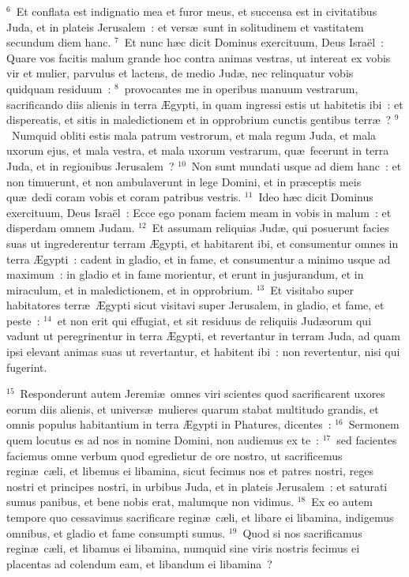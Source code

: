 ${}^{6}$~Et conflata est indignatio mea et furor meus, et succensa est in civitatibus Juda, et in plateis Jerusalem~: et vers\ae\ sunt in solitudinem et vastitatem secundum diem hanc.
${}^{7}$~Et nunc h\ae c dicit Dominus exercituum, Deus Isra\"el~: Quare vos facitis malum grande hoc contra animas vestras, ut intereat ex vobis vir et mulier, parvulus et lactens, de medio Jud\ae , nec relinquatur vobis quidquam residuum~:
${}^{8}$~provocantes me in operibus manuum vestrarum, sacrificando diis alienis in terra \AE gypti, in quam ingressi estis ut habitetis ibi~: et dispereatis, et sitis in maledictionem et in opprobrium cunctis gentibus terr\ae~?
${}^{9}$~Numquid obliti estis mala patrum vestrorum, et mala regum Juda, et mala uxorum ejus, et mala vestra, et mala uxorum vestrarum, qu\ae\ fecerunt in terra Juda, et in regionibus Jerusalem~?
${}^{10}$~Non sunt mundati usque ad diem hanc~: et non timuerunt, et non ambulaverunt in lege Domini, et in pr\ae ceptis meis qu\ae\ dedi coram vobis et coram patribus vestris.
${}^{11}$~Ideo h\ae c dicit Dominus exercituum, Deus Isra\"el~: Ecce ego ponam faciem meam in vobis in malum~: et disperdam omnem Judam.
${}^{12}$~Et assumam reliquias Jud\ae , qui posuerunt facies suas ut ingrederentur terram \AE gypti, et habitarent ibi, et consumentur omnes in terra \AE gypti~: cadent in gladio, et in fame, et consumentur a minimo usque ad maximum~: in gladio et in fame morientur, et erunt in jusjurandum, et in miraculum, et in maledictionem, et in opprobrium.
${}^{13}$~Et visitabo super habitatores terr\ae\ \AE gypti sicut visitavi super Jerusalem, in gladio, et fame, et peste~:
${}^{14}$~et non erit qui effugiat, et sit residuus de reliquiis Jud\ae orum qui vadunt ut peregrinentur in terra \AE gypti, et revertantur in terram Juda, ad quam ipsi elevant animas suas ut revertantur, et habitent ibi~: non revertentur, nisi qui fugerint.


${}^{15}$~Responderunt autem Jeremi\ae\ omnes viri scientes quod sacrificarent uxores eorum diis alienis, et univers\ae\ mulieres quarum stabat multitudo grandis, et omnis populus habitantium in terra \AE gypti in Phatures, dicentes~:
${}^{16}$~Sermonem quem locutus es ad nos in nomine Domini, non audiemus ex te~:
${}^{17}$~sed facientes faciemus omne verbum quod egredietur de ore nostro, ut sacrificemus regin\ae\ c\ae li, et libemus ei libamina, sicut fecimus nos et patres nostri, reges nostri et principes nostri, in urbibus Juda, et in plateis Jerusalem~: et saturati sumus panibus, et bene nobis erat, malumque non vidimus.
${}^{18}$~Ex eo autem tempore quo cessavimus sacrificare regin\ae\ c\ae li, et libare ei libamina, indigemus omnibus, et gladio et fame consumpti sumus.
${}^{19}$~Quod si nos sacrificamus regin\ae\ c\ae li, et libamus ei libamina, numquid sine viris nostris fecimus ei placentas ad colendum eam, et libandum ei libamina~?


